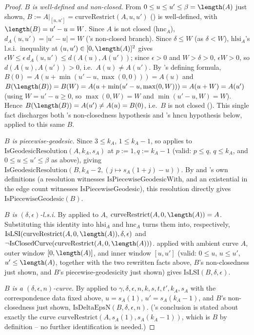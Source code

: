 \begin{proof}
  \emph{$B$ is well-defined and non-closed.} From $0\le u\le u'\le\beta=\length(A)$ just shown,
  $B := A|_{[u,u']} =
  \mathrm{curveRestrict}(A,u,u')$ () is well-defined, with $\length(B)=u'-u=
  W$. Since $A$ is not closed ($\mathrm{hnc}_A$), $d_A(u,u') = |u'-u| = W$ ('s
  non-closed branch). Since $\delta\le W$ (as $\delta<W$), $\mathrm{hlsi}_A$'s l.s.i.\ inequality at
  $(u,u')\in[0,\length(A)]^2$ gives $\epsilon W \le \epsilon\, d_A(u,u') \le d(A(u),A(u'))$; since
  $\epsilon>0$ and $W>\delta>0$, $\epsilon W>0$, so $d(A(u),A(u'))>0$, i.e.\ $A(u)\ne A(u')$. By
  's defining formula, $B(0) = A(u+\min(u'-u,\max(0,0))) = A(u)$ and
  $B(\length(B)) = B(W) = A(u+\min(u'-u,\max(0,W))) = A(u+W) = A(u')$ (using $W=u'-u\ge0$, so
  $\max(0,W)=W$ and $\min(u'-u,W)=W$). Hence $B(\length(B)) = A(u') \ne A(u) = B(0)$, i.e.\ $B$ is
  not closed (). This single fact discharges both
  's non-closedness hypothesis and 's
  $\mathrm{hncu}$ hypothesis below, applied to this same $B$.

  \emph{$B$ is piecewise-geodesic.} Since $3\le k_A$, $1\le k_A-1$, so 
  applies to $\mathrm{IsGeodesicResolution}(A,k_A,s_A)$ at $p:=1,q:=k_A-1$ (valid: $p\le q$,
  $q\le k_A$, and $0\le u\le u'\le\beta$ as above), giving
  $\mathrm{IsGeodesicResolution}(B,k_A-2,(j\mapsto s_A(1+j)-u))$. By 
  and 's own definitions (a resolution witnesses
  $\mathrm{IsPiecewiseGeodesicWith}$, and an existential in the edge count witnesses
  $\mathrm{IsPiecewiseGeodesic}$), this resolution directly gives $\mathrm{IsPiecewiseGeodesic}(B)$.

  \emph{$B$ is $(\delta,\epsilon)$-l.s.i.} By  applied to $A$,
  $\mathrm{curveRestrict}(A,0,\length(A)) = A$. Substituting this identity into
  $\mathrm{hlsi}_A$ and $\mathrm{hnc}_A$ turns them into, respectively,
  $\mathrm{IsLSI}(\mathrm{curveRestrict}(A,0,\length(A)),\delta,\epsilon)$ and
  $\neg\mathrm{IsClosedCurve}(\mathrm{curveRestrict}(A,0,\length(A)))$. 
  applied with ambient curve $A$, outer window $[0,\length(A)]$, and inner window $[u,u']$ (valid:
  $0\le u$, $u\le u'$, $u'\le\length(A)$, together with the two rewritten facts above, $B$'s
  non-closedness just shown, and $B$'s piecewise-geodesicity just shown) gives
  $\mathrm{IsLSI}(B,\delta,\epsilon)$.

  \emph{$B$ is a $(\delta,\epsilon,n)$-curve.} By  applied to
  $\gamma,\delta,\epsilon,n,k,s,t,t',k_A,s_A$ with the correspondence data fixed above, $u=s_A(1)$,
  $u'=s_A(k_A-1)$, and $B$'s non-closedness just shown, $\mathrm{IsDeltaEpsN}(B,\delta,\epsilon,n)$.
  ('s conclusion is stated about exactly the curve
  $\mathrm{curveRestrict}(A,s_A(1),s_A(k_A-1))$, which is $B$ by definition -- no further
  identification is needed.)


\end{proof}

